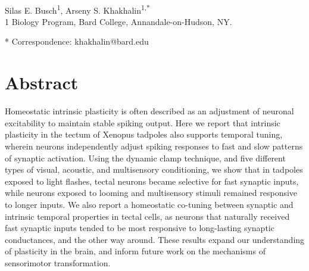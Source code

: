 \documentclass{article}
\begin{document}



\begin{flushleft}
{\Large
\textbf{}
}
\newline
\\
Silas E. Busch\textsuperscript{1},
Arseny S. Khakhalin\textsuperscript{1,*}
\\
\bigskip
{1} Biology Program, Bard College, Annandale-on-Hudson, NY. 

* Correspondence: khakhalin@bard.edu

\section*{Abstract}

Homeostatic intrinsic plasticity is often described as an adjustment of neuronal excitability to maintain stable spiking output. Here we report that intrinsic plasticity in the tectum of Xenopus tadpoles also supports temporal tuning, wherein neurons independently adjust spiking responses to fast and slow patterns of synaptic activation. Using the dynamic clamp technique, and five different types of visual, acoustic, and multisensory conditioning, we show that in tadpoles exposed to light flashes, tectal neurons became selective for fast synaptic inputs, while neurons exposed to looming and multisensory stimuli remained responsive to longer inputs. We also report a homeostatic co-tuning between synaptic and intrinsic temporal properties in tectal cells, as neurons that naturally received fast synaptic inputs tended to be most responsive to long-lasting synaptic conductances, and the other way around. These results expand our understanding of plasticity in the brain, and inform future work on the mechanisms of sensorimotor transformation.




\end{flushleft}
\end{document}

